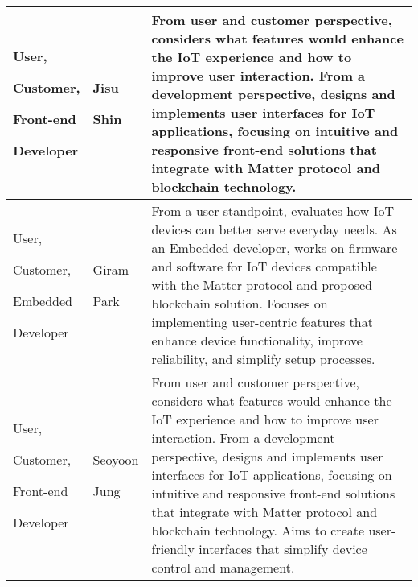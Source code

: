 \documentclass[conference]{IEEEtran}
\begin{document}
\begin{table}
	\def\arraystretch{1.24} \small
	\begin{tabular}{|p{1.8cm}|p{1.4cm}|p{4.4cm}|}
		\hline
		        
		User, \par Customer, \par Front-end \par Developer & Jisu \par Shin    & From user and customer perspective, considers what features would enhance the IoT experience and how to improve user interaction. From a development perspective, designs and implements user interfaces for IoT applications, focusing on intuitive and responsive front-end solutions that integrate with Matter protocol and blockchain technology.                                                                                      \\ \hline
		        
		User, \par Customer, \par Embedded \par Developer  & Giram \par Park   & From a user standpoint, evaluates how IoT devices can better serve everyday needs. As an Embedded developer, works on firmware and software for IoT devices compatible with the Matter protocol and proposed blockchain solution. Focuses on implementing user-centric features that enhance device functionality, improve reliability, and simplify setup processes.                                                                       \\ \hline
		        
		User, \par Customer, \par Front-end \par Developer & Seoyoon \par Jung & From user and customer perspective, considers what features would enhance the IoT experience and how to improve user interaction. From a development perspective, designs and implements user interfaces for IoT applications, focusing on intuitive and responsive front-end solutions that integrate with Matter protocol and blockchain technology. Aims to create user-friendly interfaces that simplify device control and management. \\ \hline
	\end{tabular}
\end{table}
\end{document}

